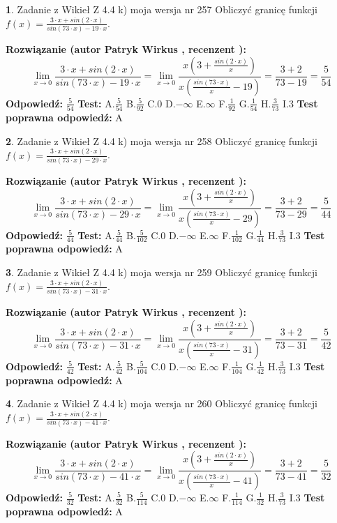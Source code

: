 \documentclass[12pt, a4paper]{article}
\theoremstyle{definition} %
\newtheorem{zad}{}
\newcommand{\zadStart}[1]{\begin{zad}#1\newline}
\newcommand{\zadStop}{\end{zad}}
\newcommand{\rozwStart}[2]{\noindent \textbf{Rozwiązanie (autor #1 , recenzent #2): }\newline}
\newcommand{\rozwStop}{\newline}
\newcommand{\odpStart}{\noindent \textbf{Odpowiedź:}\newline}
\newcommand{\odpStop}{\newline}
\newcommand{\testStart}{\noindent \textbf{Test:}\newline}
\newcommand{\testStop}{\newline}
\newcommand{\kluczStart}{\noindent \textbf{Test poprawna odpowiedź:}\newline}
\newcommand{\kluczStop}{\newline}
\begin{document}
\zadStart{Zadanie z Wikieł Z 4.4 k) moja wersja nr 257}
Obliczyć granicę funkcji $f(x)=\frac{3\cdot x +sin(2\cdot x)}{sin(73\cdot x) -19\cdot x}$.
\zadStop
\rozwStart{Patryk Wirkus}{}
$$\lim\limits_{x\to 0}\frac{3\cdot x +sin(2\cdot x)}{sin(73\cdot x) -19\cdot x}
=\lim\limits_{x\to 0}\frac{x(3+\frac{sin(2\cdot x)}{x})}{x(\frac{sin(73\cdot x)}{x}-19)}
=\frac{3+2}{73-19} = \frac{5}{54}$$
\rozwStop
\odpStart
$\frac{5}{54}$
\odpStop
\testStart
A.$\frac{5}{54}$
B.$\frac{5}{92}$
C.$0$
D.$-\infty$
E.$\infty$
F.$\frac{1}{92}$
G.$\frac{1}{54}$
H.$\frac{3}{73}$
I.$3$
\testStop
\kluczStart
A
\kluczStop



\zadStart{Zadanie z Wikieł Z 4.4 k) moja wersja nr 258}
Obliczyć granicę funkcji $f(x)=\frac{3\cdot x +sin(2\cdot x)}{sin(73\cdot x) -29\cdot x}$.
\zadStop
\rozwStart{Patryk Wirkus}{}
$$\lim\limits_{x\to 0}\frac{3\cdot x +sin(2\cdot x)}{sin(73\cdot x) -29\cdot x}
=\lim\limits_{x\to 0}\frac{x(3+\frac{sin(2\cdot x)}{x})}{x(\frac{sin(73\cdot x)}{x}-29)}
=\frac{3+2}{73-29} = \frac{5}{44}$$
\rozwStop
\odpStart
$\frac{5}{44}$
\odpStop
\testStart
A.$\frac{5}{44}$
B.$\frac{5}{102}$
C.$0$
D.$-\infty$
E.$\infty$
F.$\frac{1}{102}$
G.$\frac{1}{44}$
H.$\frac{3}{73}$
I.$3$
\testStop
\kluczStart
A
\kluczStop



\zadStart{Zadanie z Wikieł Z 4.4 k) moja wersja nr 259}
Obliczyć granicę funkcji $f(x)=\frac{3\cdot x +sin(2\cdot x)}{sin(73\cdot x) -31\cdot x}$.
\zadStop
\rozwStart{Patryk Wirkus}{}
$$\lim\limits_{x\to 0}\frac{3\cdot x +sin(2\cdot x)}{sin(73\cdot x) -31\cdot x}
=\lim\limits_{x\to 0}\frac{x(3+\frac{sin(2\cdot x)}{x})}{x(\frac{sin(73\cdot x)}{x}-31)}
=\frac{3+2}{73-31} = \frac{5}{42}$$
\rozwStop
\odpStart
$\frac{5}{42}$
\odpStop
\testStart
A.$\frac{5}{42}$
B.$\frac{5}{104}$
C.$0$
D.$-\infty$
E.$\infty$
F.$\frac{1}{104}$
G.$\frac{1}{42}$
H.$\frac{3}{73}$
I.$3$
\testStop
\kluczStart
A
\kluczStop



\zadStart{Zadanie z Wikieł Z 4.4 k) moja wersja nr 260}
Obliczyć granicę funkcji $f(x)=\frac{3\cdot x +sin(2\cdot x)}{sin(73\cdot x) -41\cdot x}$.
\zadStop
\rozwStart{Patryk Wirkus}{}
$$\lim\limits_{x\to 0}\frac{3\cdot x +sin(2\cdot x)}{sin(73\cdot x) -41\cdot x}
=\lim\limits_{x\to 0}\frac{x(3+\frac{sin(2\cdot x)}{x})}{x(\frac{sin(73\cdot x)}{x}-41)}
=\frac{3+2}{73-41} = \frac{5}{32}$$
\rozwStop
\odpStart
$\frac{5}{32}$
\odpStop
\testStart
A.$\frac{5}{32}$
B.$\frac{5}{114}$
C.$0$
D.$-\infty$
E.$\infty$
F.$\frac{1}{114}$
G.$\frac{1}{32}$
H.$\frac{3}{73}$
I.$3$
\testStop
\kluczStart
A
\kluczStop
\end{document}
